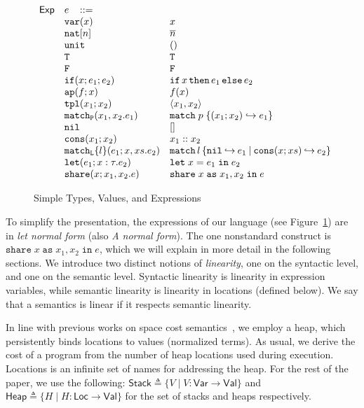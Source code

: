 \documentclass{easychair}
\newcommand{\ms}[1]{\ensuremath{\mathsf{#1}}}
\newcommand{\irl}[1]{\mathtt{#1}}
\newcommand{\paircaseabt}[4]{\irl{match_P}(#2,#3.#4)}
\newcommand{\paircasecst}[4]{\irl{match} \; #1\; \{(#2;#3) \hookrightarrow #4\}}
\newcommand{\sharecst}[4]{\irl{share}\;#1\;\irl{as}\;#2,#3\;\irl{in}\;#4}
\newcommand{\shareabt}[4]{\irl{share}(#1;#2,#3.#4)}
\theoremstyle{definition}
\begin{document}
\begin{figure}[t!]
\begin{minipage}[t]{0.59\linewidth}
\[\begin{array}{r l l l}
\ms{Exp}
        & e   \,\,\,\,\, ::= \\
 	& \irl{var}(x)                                			& x 											\\	
  & \irl{nat}[n]							& \numeral{n}											\\	
  & \irl{unit}							& ()											\\	
  & \irl{T}							& \irl{T}											\\	
  & \irl{F}	   					& \irl{F}											\\	
  & \ifexabt{x}{e_1}{e_2} & \ifexcst{x}{e_1}{e_2} \\ 
  & \irl{ap}(f;x) 					& \appcst{f}{x} 									\\	
  & \irl{tpl}(x_1;x_2)     	& \pairexcst{x_1}{x_2}                								\\	
 	& \paircaseabt{p}{x_1}{x_2}{e_1}					& \paircasecst{p}{x_1}{x_2}{e_1}   \\	
 	& \nilexabt					& []   									\\	
 	& \consexabt{x_1}{x_2}					& x_1::x_2   									\\	
 	& \listcaseexabt{l}{e_1}{x}{xs}{e_2}					& \listcaseexcst{l}{e_1}{x}{xs}{e_2}   \\	
  & \irl{let}(e_1; x : \tau.e_2)			& \irl{let}\; x = e_1 \; \irl{in}\; e_2   \\	
  & \shareabt{x}{x_1}{x_2}{e} &\sharecst{x}{x_1}{x_2}{e}\\ 
\end{array}
\]
\end{minipage}

	\caption{Simple Types, Values, and Expressions }
\label{fig:exp}
\end{figure}

To simplify the presentation, the expressions of our language (see Figure~\ref{fig:exp}) are in \emph{let normal form} (also \emph{A normal form}).
The one nonstandard construct is $\sharecst{x}{x_1}{x_2}{e}$, which we will explain in more 
detail in the following sections. We introduce two distinct notions of \emph{linearity}, one on 
the syntactic level, and one on the semantic level. Syntactic linearity is linearity in 
expression variables, while semantic linearity is linearity in locations (defined below).
We say that a semantics is linear if it respects semantic linearity.

In line with previous works on space cost
semantics~\cite{Spoonhower:2008:SPP:1411204.1411240,DBLP:journals/entcs/Minamide99},
we employ a heap, which persistently binds
locations to values (normalized terms).  As usual, we derive the cost
of a program from the number of heap locations 
used during execution. Locations is an infinite set of names
for addressing the heap.
%
For the rest of the paper, we use the following:
$\ms{Stack} \triangleq \{ V \mid V : \ms{Var} \to \ms{Val} \}$
and $\ms{Heap} \triangleq \{ H \mid H: \ms{Loc} \to \ms{Val} \}$
for the set of stacks and heaps respectively. 
\end{document}

